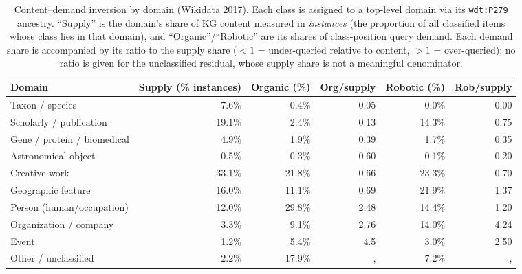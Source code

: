\documentclass[sw]{iosart2x}
\begin{document}
\begin{table}[ht]
\centering
\caption{Content--demand inversion by domain (Wikidata 2017). Each class is assigned to a top-level domain via its \texttt{wdt:P279} ancestry. ``Supply'' is the domain's share of KG content measured in \emph{instances} (the proportion of all classified items whose class lies in that domain), and ``Organic''/``Robotic'' are its shares of class-position query demand. Each demand share is accompanied by its ratio to the supply share ($<1$ = under-queried relative to content, $>1$ = over-queried); no ratio is given for the unclassified residual, whose supply share is not a meaningful denominator.}
\label{tab:domains}
\begin{tabular}{l|r|r|r|r|r}
\hline
Domain & Supply (\% instances) & Organic (\%) & Org/supply & Robotic (\%) & Rob/supply \\
\hline
Taxon / species              & 7.6\%  & 0.4\%  & 0.05 & 0.0\%  & 0.00 \\
Scholarly / publication      & 19.1\% & 2.4\%  & 0.13 & 14.3\% & 0.75 \\
Gene / protein / biomedical  & 4.9\%  & 1.9\%  & 0.39 & 1.7\%  & 0.35 \\
Astronomical object          & 0.5\%  & 0.3\%  & 0.60 & 0.1\%  & 0.20 \\
Creative work                & 33.1\% & 21.8\% & 0.66 & 23.3\% & 0.70 \\
Geographic feature           & 16.0\% & 11.1\% & 0.69 & 21.9\% & 1.37 \\
Person (human/occupation)    & 12.0\% & 29.8\% & 2.48 & 14.4\% & 1.20 \\
Organization / company       & 3.3\%  & 9.1\%  & 2.76 & 14.0\% & 4.24 \\
Event                        & 1.2\%  & 5.4\%  & 4.5  & 3.0\%  & 2.50 \\
Other / unclassified         & 2.2\%  & 17.9\% &, & 7.2\%  &, \\
\hline
\end{tabular}
\end{table}
\end{document}
